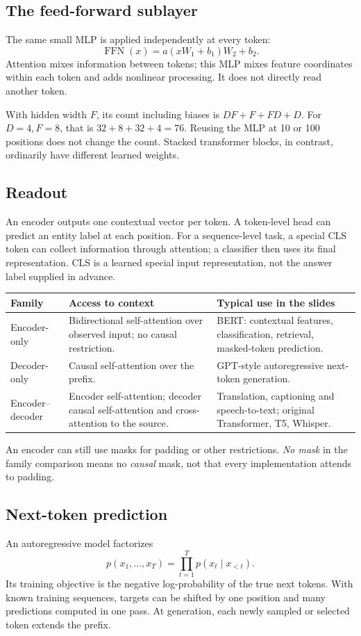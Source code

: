 \documentclass[11pt]{article}
\begin{document}
\subsection{The feed-forward sublayer}
The same small MLP is applied independently at every token:
\[
\operatorname{FFN}(x)=a(xW_1+b_1)W_2+b_2.
\]
Attention mixes information between tokens; this MLP mixes feature coordinates within each token and adds nonlinear processing. It does not directly read another token.

With hidden width $F$, its count including biases is $DF+F+FD+D$. For $D=4,F=8$, that is $32+8+32+4=76$. Reusing the MLP at 10 or 100 positions does not change the count. Stacked transformer blocks, in contrast, ordinarily have different learned weights.

\subsection{Readout}
An encoder outputs one contextual vector per token. A token-level head can predict an entity label at each position. For a sequence-level task, a special CLS token can collect information through attention; a classifier then uses its final representation. CLS is a learned special input representation, not the answer label supplied in advance.

\begin{longtable}{@{}P{.20\textwidth}P{.33\textwidth}P{.37\textwidth}@{}}
\toprule Family & Access to context & Typical use in the slides\\\midrule\endhead
Encoder-only & Bidirectional self-attention over observed input; no causal restriction. & BERT: contextual features, classification, retrieval, masked-token prediction.\\
Decoder-only & Causal self-attention over the prefix. & GPT-style autoregressive next-token generation.\\
Encoder--decoder & Encoder self-attention; decoder causal self-attention and cross-attention to the source. & Translation, captioning and speech-to-text; original Transformer, T5, Whisper.\\\bottomrule
\end{longtable}
An encoder can still use masks for padding or other restrictions. \emph{No mask} in the family comparison means no \emph{causal} mask, not that every implementation attends to padding.

\subsection{Next-token prediction}
An autoregressive model factorizes
\[
p(x_1,\ldots,x_T)=\prod_{t=1}^{T}p(x_t\mid x_{<t}).
\]
Its training objective is the negative log-probability of the true next tokens. With known training sequences, targets can be shifted by one position and many predictions computed in one pass. At generation, each newly sampled or selected token extends the prefix.
\end{document}
